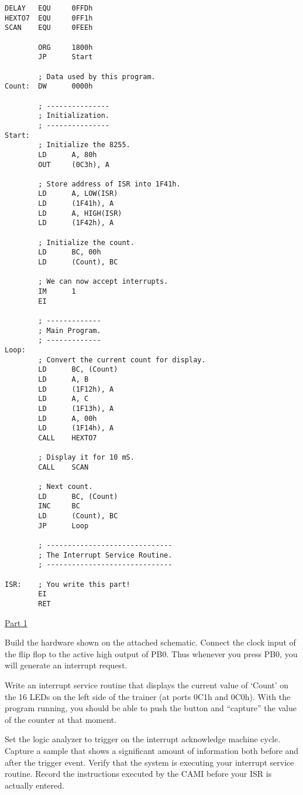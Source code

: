 \begin{verbatim}
DELAY   EQU     0FFDh
HEXTO7  EQU     0FF1h
SCAN    EQU     0FEEh

        ORG     1800h
        JP      Start

        ; Data used by this program.
Count:  DW      0000h

        ; ---------------
        ; Initialization.
        ; ---------------
Start:
        ; Initialize the 8255.
        LD      A, 80h
        OUT     (0C3h), A

        ; Store address of ISR into 1F41h.
        LD      A, LOW(ISR)
        LD      (1F41h), A
        LD      A, HIGH(ISR)
        LD      (1F42h), A

        ; Initialize the count.
        LD      BC, 00h
        LD      (Count), BC

        ; We can now accept interrupts.
        IM      1
        EI

        ; -------------
        ; Main Program.
        ; -------------
Loop:
        ; Convert the current count for display.
        LD      BC, (Count)
        LD      A, B
        LD      (1F12h), A
        LD      A, C
        LD      (1F13h), A
        LD      A, 00h
        LD      (1F14h), A
        CALL    HEXTO7

        ; Display it for 10 mS.
        CALL    SCAN

        ; Next count.
        LD      BC, (Count)
        INC     BC
        LD      (Count), BC
        JP      Loop

        ; ------------------------------
        ; The Interrupt Service Routine.
        ; ------------------------------

ISR:    ; You write this part!
        EI
        RET
\end{verbatim}

\underline{\large{Part 1}}

Build the hardware shown on the attached schematic. Connect the clock input
of the flip flop to the active high output of PB0. Thus whenever you press
PB0, you will generate an interrupt request.

Write an interrupt service routine that displays the current value of
`Count' on the 16 LEDs on the left side of the trainer (at ports 0C1h and
0C0h). With the program running, you should be able to push the button and
``capture'' the value of the counter at that moment.

Set the logic analyzer to trigger on the interrupt acknowledge machine
cycle. Capture a sample that shows a significant amount of information both
before and after the trigger event. Verify that the system is executing
your interrupt service routine. Record the instructions executed by the
CAMI before your ISR is actually entered.


